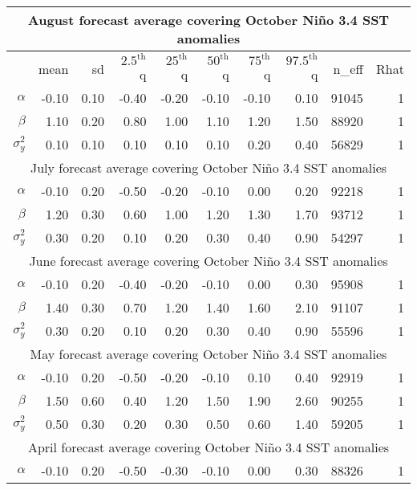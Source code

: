 \begin{table*}[ht]
\centering
\footnotesize
\begin{tabular}{rrrrrrrrrr}
\hline
\multicolumn{10}{c}{August forecast average covering October Ni\~no 3.4 SST anomalies}\\

  \hline
 & mean & sd & $2.5^{\mbox{th}}$ q & $25^{\mbox{th}}$ q & $50^{\mbox{th}}$ q & $75^{\mbox{th}}$ q & $97.5^{\mbox{th}}$ q & n\_eff & Rhat \\ 
  \hline
$\alpha$ & -0.10 & 0.10 & -0.40 & -0.20 & -0.10 & -0.10 & 0.10 & 91045 &   1 \\ 
  $\beta$ & 1.10 & 0.20 & 0.80 & 1.00 & 1.10 & 1.20 & 1.50 & 88920 &   1 \\ 
  $\sigma^{2}_{y}$ & 0.10 & 0.10 & 0.10 & 0.10 & 0.10 & 0.20 & 0.40 & 56829 &   1 \\ 
   \hline
\hline
\multicolumn{10}{c}{July forecast average covering October Ni\~no 3.4 SST anomalies}\\
  \hline
$\alpha$ & -0.10 & 0.20 & -0.50 & -0.20 & -0.10 & 0.00 & 0.20 & 92218 &   1 \\ 
  $\beta$ & 1.20 & 0.30 & 0.60 & 1.00 & 1.20 & 1.30 & 1.70 & 93712 &   1 \\ 
  $\sigma^{2}_{y}$ & 0.30 & 0.20 & 0.10 & 0.20 & 0.30 & 0.40 & 0.90 & 54297 &   1 \\ 
   \hline
\hline
\multicolumn{10}{c}{June forecast average covering October Ni\~no 3.4 SST anomalies}\\
  \hline
$\alpha$ & -0.10 & 0.20 & -0.40 & -0.20 & -0.10 & 0.00 & 0.30 & 95908 &   1 \\ 
  $\beta$ & 1.40 & 0.30 & 0.70 & 1.20 & 1.40 & 1.60 & 2.10 & 91107 &   1 \\ 
  $\sigma^{2}_{y}$ & 0.30 & 0.20 & 0.10 & 0.20 & 0.30 & 0.40 & 0.90 & 55596 &   1 \\ 
   \hline
\hline
\multicolumn{10}{c}{May forecast average covering October Ni\~no 3.4 SST anomalies}\\
  \hline
$\alpha$ & -0.10 & 0.20 & -0.50 & -0.20 & -0.10 & 0.10 & 0.40 & 92919 &   1 \\ 
  $\beta$ & 1.50 & 0.60 & 0.40 & 1.20 & 1.50 & 1.90 & 2.60 & 90255 &   1 \\ 
  $\sigma^{2}_{y}$ & 0.50 & 0.30 & 0.20 & 0.30 & 0.50 & 0.60 & 1.40 & 59205 &   1 \\ 
   \hline
\hline
\multicolumn{10}{c}{April forecast average covering October Ni\~no 3.4 SST anomalies}\\
  \hline
$\alpha$ & -0.10 & 0.20 & -0.50 & -0.30 & -0.10 & 0.00 & 0.30 & 88326 &   1 \\ 

\end{tabular}
\end{table*}
